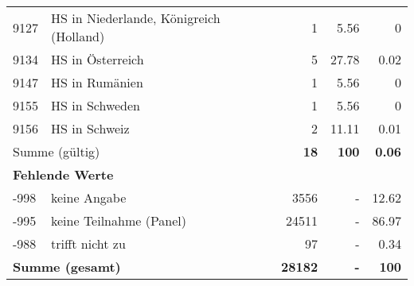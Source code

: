 \begin{longtable}{lXrrr}
     9127 &
     \multicolumn{1}{X}{ HS in Niederlande, Königreich (Holland)   } &


       \num{1} &
       \num[round-mode=places,round-precision=2]{5,56} &
         \num[round-mode=places,round-precision=2]{0} \\

     9134 &
     \multicolumn{1}{X}{ HS in Österreich   } &


       \num{5} &
       \num[round-mode=places,round-precision=2]{27,78} &
         \num[round-mode=places,round-precision=2]{0,02} \\

     9147 &
     \multicolumn{1}{X}{ HS in Rumänien   } &


       \num{1} &
       \num[round-mode=places,round-precision=2]{5,56} &
         \num[round-mode=places,round-precision=2]{0} \\

     9155 &
     \multicolumn{1}{X}{ HS in Schweden   } &


       \num{1} &
       \num[round-mode=places,round-precision=2]{5,56} &
         \num[round-mode=places,round-precision=2]{0} \\

     9156 &
     \multicolumn{1}{X}{ HS in Schweiz   } &


       \num{2} &
       \num[round-mode=places,round-precision=2]{11,11} &
         \num[round-mode=places,round-precision=2]{0,01} \\
     \midrule
     \multicolumn{2}{l}{Summe (gültig)} &
       \textbf{\num{18}} &
     \textbf{100} &
       \textbf{\num[round-mode=places,round-precision=2]{0,06}} \\
     \multicolumn{5}{l}{\textbf{Fehlende Werte}}\\
       -998 &
       keine Angabe &
         \num{3556} &
        - &
         \num[round-mode=places,round-precision=2]{12,62} \\
       -995 &
       keine Teilnahme (Panel) &
         \num{24511} &
        - &
         \num[round-mode=places,round-precision=2]{86,97} \\
       -988 &
       trifft nicht zu &
         \num{97} &
        - &
         \num[round-mode=places,round-precision=2]{0,34} \\
     \midrule
     \multicolumn{2}{l}{\textbf{Summe (gesamt)}} &
          \textbf{\num{28182}} &
        \textbf{-} &
        \textbf{100} \\
     \bottomrule
     \end{longtable}
     
